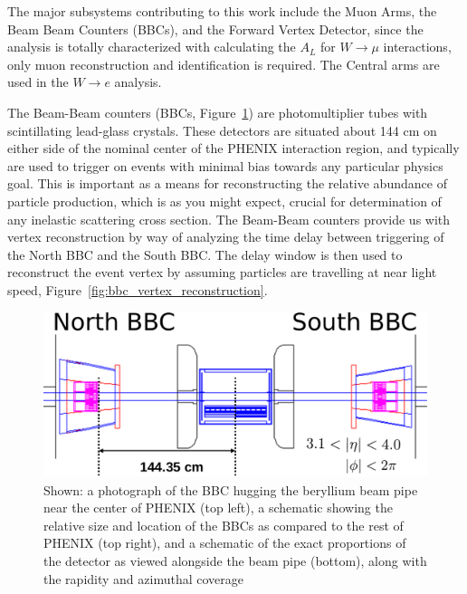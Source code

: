 The major subsystems contributing to this work include the Muon Arms, the Beam
Beam Counters (BBCs), and the Forward Vertex Detector, since the analysis is
totally characterized with calculating the $A_L$ for $W\rightarrow\mu$
interactions, only muon reconstruction and identification is required. The
Central arms are used in the $W\rightarrow e$ analysis. 

The Beam-Beam counters (BBCs, Figure~\ref{fig:bbc_overview}) are photomultiplier
tubes with scintillating lead-glass crystals. These detectors are situated about
144 cm on either side of the nominal center of the PHENIX interaction region,
and typically are used to trigger on events with minimal bias towards any
particular physics goal. This is important as a means for reconstructing the
relative abundance of particle production, which is as you might expect, crucial
for determination of any inelastic scattering cross section. The Beam-Beam
counters provide us with vertex reconstruction by way of analyzing the time
delay between triggering of the North BBC and the South BBC. The delay window is
then used to reconstruct the event vertex by assuming particles are travelling
at near light speed, Figure~\ref{fig:bbc_vertex_reconstruction}. 

\begin{figure}[ht]
  \centering
  \includegraphics[width=\linewidth]{./figures/bbc_overview}
  \caption{
    Shown: a photograph of the BBC hugging the beryllium beam pipe near the
    center of PHENIX (top left), a schematic showing the relative size and
    location of the BBCs as compared to the rest of PHENIX (top right), and a
    schematic of the exact proportions of the detector as viewed alongside the
    beam pipe (bottom), along with the rapidity and azimuthal
    coverage~\cite{Nakamura2002}
  }
  \label{fig:bbc_overview}
\end{figure}

